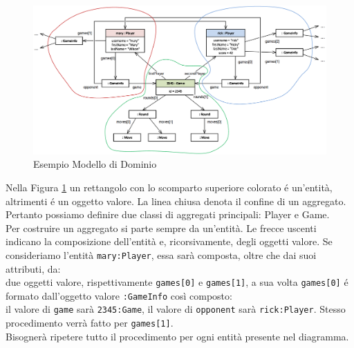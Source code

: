 \begin{figure}[H]
    \begin{center}
        \includegraphics[width=1.05\textwidth]{img/designAggregati}
    \end{center}
\caption{Esempio Modello di Dominio}
    \label{modelloDominio}
\end{figure}
Nella Figura \ref{modelloDominio} un rettangolo con lo scomparto superiore colorato é un'entità, altrimenti
é un oggetto valore. La linea chiusa denota il confine di un aggregato.
Pertanto possiamo definire due classi di aggregati principali: Player e Game.\\
Per costruire un aggregato si parte sempre da un'entità.
Le frecce uscenti indicano la composizione dell'entità e, ricorsivamente, degli oggetti valore.
Se consideriamo l'entità \texttt{mary:Player}, essa sarà composta, oltre che dai suoi attributi, da:\\
due oggetti valore, rispettivamente \texttt{games[0]} e \texttt{games[1]}, a sua volta \texttt{games[0]} é formato dall'oggetto
valore \texttt{:GameInfo} così composto:\\
il valore di \texttt{game} sarà \texttt{2345:Game}, il valore di \texttt{opponent} sarà \texttt{rick:Player}.
Stesso procedimento verrà fatto per \texttt{games[1]}.\\
Bisognerà ripetere tutto il procedimento per ogni entità presente nel diagramma.


